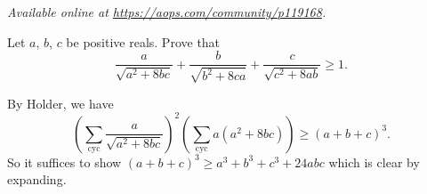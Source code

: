 \textsl{Available online at \url{https://aops.com/community/p119168}.}
\begin{mdframed}[style=mdpurplebox,frametitle={Problem statement}]
Let $a$, $b$, $c$ be positive reals. Prove that
\[ \frac{a}{\sqrt{a^2+8bc}} + \frac{b}{\sqrt{b^2+8ca}} + \frac{c}{\sqrt{c^2+8ab}} \ge 1. \]
\end{mdframed}
By Holder, we have
\[
  \left( \sum_{\text{cyc}} \frac{a}{\sqrt{a^2+8bc}} \right)^2
  \left( \sum_{\text{cyc}} a(a^2+8bc) \right)
  \ge (a+b+c)^3.
\]
So it suffices to show $(a+b+c)^3 \ge a^3+b^3+c^3+24abc$ which is clear by expanding.
\pagebreak